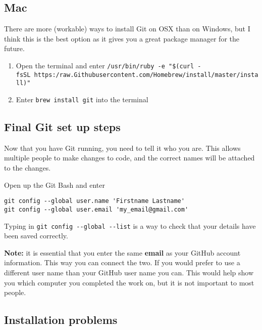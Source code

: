 \documentclass[]{book}
\providecommand{\tightlist}{%
  \setlength{\itemsep}{0pt}\setlength{\parskip}{0pt}}
\begin{document}
\hypertarget{mac}{%
\subsection{Mac}\label{mac}}

There are more (workable) ways to install Git on OSX than on Windows, but I think this is the best option as it gives you a great package manager for the future.

\begin{enumerate}
\def\labelenumi{\arabic{enumi}.}
\tightlist
\item
  Open the terminal and enter \texttt{/usr/bin/ruby\ -e\ "\$(curl\ -fsSL\ https:/raw.Githubusercontent.com/Homebrew/install/master/install)"}
\item
  Enter \texttt{brew\ install\ git} into the terminal
\end{enumerate}

\hypertarget{final-git-set-up-steps}{%
\subsection{Final Git set up steps}\label{final-git-set-up-steps}}

Now that you have Git running, you need to tell it who you are. This allows multiple people to make changes to code, and the correct names will be attached to the changes.

Open up the Git Bash and enter

\begin{verbatim}
git config --global user.name 'Firstname Lastname'
git config --global user.email 'my_email@gmail.com'
\end{verbatim}

Typing in \texttt{git\ config\ -\/-global\ -\/-list} is a way to check that your details have been saved correctly.

\textbf{Note:} it is essential that you enter the same \textbf{email} as your GitHub account information. This way you can connect the two. If you would prefer to use a different user name than your GitHub user name you can. This would help show you which computer you completed the work on, but it is not important to most people.

\hypertarget{installation-problems}{%
\subsection{Installation problems}\label{installation-problems}}
\end{document}
